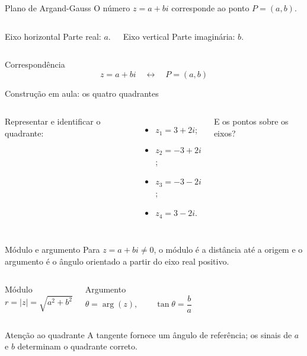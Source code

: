 \documentclass[aspectratio=169]{beamer}
\begin{document}
\begin{frame}{Plano de Argand-Gauss}
\vspace{-0.4em}
\small
O número $z=a+bi$ corresponde ao ponto $P=(a,b)$.

\vspace{0.35em}
\begin{columns}[T,onlytextwidth]
\begin{block}{Eixo horizontal}
Parte real: $a$.
\end{block}
\begin{block}{Eixo vertical}
Parte imaginária: $b$.
\end{block}
\end{columns}

\vspace{0.35em}
\begin{block}{Correspondência}
\[
  z=a+bi \quad\longleftrightarrow\quad P=(a,b)
\]
\end{block}
\end{frame}

\begin{frame}{Construção em aula: os quatro quadrantes}
\vspace{-0.65em}
\begin{columns}[T,onlytextwidth]
\small
Representar e identificar o quadrante:
\begin{itemize}
  \item $z_1=3+2i$;
  \item $z_2=-3+2i$;
  \item $z_3=-3-2i$;
  \item $z_4=3-2i$.
\end{itemize}
E os pontos sobre os eixos?

\centering

\end{columns}
\end{frame}

\begin{frame}{Módulo e argumento}
\vspace{-0.45em}
\small
Para $z=a+bi\neq0$, o módulo é a distância até a origem e o argumento é o ângulo orientado a partir do eixo real positivo.
\begin{columns}[T,onlytextwidth]
\begin{block}{Módulo}
\[
  r=|z|=\sqrt{a^2+b^2}
\]
\end{block}
\begin{block}{Argumento}
\[
  \theta=\arg(z),\qquad \tan\theta=\frac{b}{a}
\]
\end{block}
\end{columns}
\begin{alertblock}{Atenção ao quadrante}
A tangente fornece um ângulo de referência; os sinais de $a$ e $b$ determinam o quadrante correto.
\end{alertblock}
\end{frame}
\end{document}
